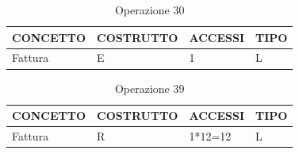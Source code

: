 \begin{table}[H]
\centering
\caption{Operazione 30}
\begin{tabular}{llll}
\\ \hline
\multicolumn{1}{|l|}{\textbf{CONCETTO}} & \multicolumn{1}{l|}{\textbf{COSTRUTTO}} & \multicolumn{1}{l|}{\textbf{ACCESSI}} & \multicolumn{1}{l|}{\textbf{TIPO}} \\ \hline
\multicolumn{1}{|l|}{Fattura}
& \multicolumn{1}{l|}{E}                  & \multicolumn{1}{l|}{1}                & \multicolumn{1}{l|}{L}             \\ \hline
\end{tabular}
\end{table}

\begin{table}[H]
\centering
\caption{Operazione 39}
\begin{tabular}{llll}
\\ \hline
\multicolumn{1}{|l|}{\textbf{CONCETTO}} & \multicolumn{1}{l|}{\textbf{COSTRUTTO}} & \multicolumn{1}{l|}{\textbf{ACCESSI}} & \multicolumn{1}{l|}{\textbf{TIPO}} \\ \hline
\multicolumn{1}{|l|}{Fattura}
& \multicolumn{1}{l|}{R}                  & \multicolumn{1}{l|}{1*12=12}                & \multicolumn{1}{l|}{L}             \\ \hline
\end{tabular}
\end{table}


\begin{table}[H]
\centering
\caption{Costo Operazioni con ridondanza}
\label{my-label}
\end{table}


